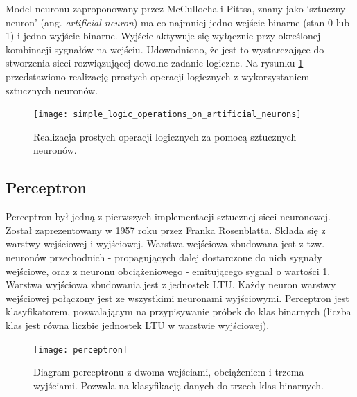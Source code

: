 \documentclass[a4paper,12pt]{article}
\numberwithin{figure}{section}
\begin{document}
    \bigskip

    Model neuronu zaproponowany przez McCullocha i Pittsa, znany jako `sztuczny neuron' (ang. \textit{artificial neuron}) ma co najmniej jedno wejście binarne (stan 0 lub 1) i jedno wyjście binarne. Wyjście aktywuje się wyłącznie przy określonej kombinacji sygnałów na wejściu. Udowodniono, że jest to wystarczające do stworzenia sieci rozwiązującej dowolne zadanie logiczne\cite{UczenieMaszynowe2018}. Na rysunku \ref{fig:simple_logic_operations_on_artificial_neurons} przedstawiono realizację prostych operacji logicznych z wykorzystaniem sztucznych neuronów.

    \bigskip

    \begin{figure}[H]
        \centering
        \texttt{[image: simple\_logic\_operations\_on\_artificial\_neurons]}
        \caption{Realizacja prostych operacji logicznych za pomocą sztucznych neuronów\cite{UczenieMaszynowe2018}.}
        \label{fig:simple_logic_operations_on_artificial_neurons}
    \end{figure}

    \subsection{Perceptron}

    Perceptron był jedną z pierwszych implementacji sztucznej sieci neuronowej. Został zaprezentowany w 1957 roku przez Franka Rosenblatta. Składa się z warstwy wejściowej i wyjściowej. Warstwa wejściowa zbudowana jest z tzw. neuronów przechodnich - propagujących dalej dostarczone do nich sygnały wejściowe, oraz z neuronu obciążeniowego - emitującego sygnał o wartości 1. Warstwa wyjściowa zbudowania jest z jednostek LTU. Każdy neuron warstwy wejściowej połączony jest ze wszystkimi neuronami wyjściowymi. Perceptron jest klasyfikatorem, pozwalającym na przypisywanie próbek do klas binarnych (liczba klas jest równa liczbie jednostek LTU w warstwie wyjściowej)\cite{UczenieMaszynowe2018}.

    \bigskip

    \begin{figure}[H]
        \centering
        \texttt{[image: perceptron]}
        \caption{Diagram perceptronu z dwoma wejściami, obciążeniem i trzema wyjściami. Pozwala na klasyfikację danych do trzech klas binarnych\cite{UczenieMaszynowe2018}.}
        \label{fig:perceptron}
    \end{figure}

    \bigskip
\end{document}

